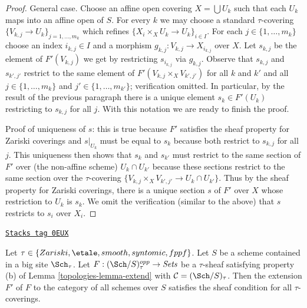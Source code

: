 \begin{proof}
\medskip\noindent
General case. Choose an affine open covering $X = \bigcup U_k$ such that
each $U_k$ maps into an affine open of $S$. For every $k$ we may choose
a standard $\tau$-covering $\{V_{k, j} \to U_k\}_{j = 1, \ldots, m_k}$
which refines $\{X_i \times_X U_k \to U_k\}_{i \in I}$. For each
$j \in \{1, \ldots, m_k\}$ choose an index $i_{k, j} \in I$
and a morphism $g_{k, j} : V_{k, j} \to X_{i_{k, j}}$ over $X$.
Let $s_{k, j}$ be the element of $F'(V_{k, j})$ we get by restricting
$s_{i_{k, j}}$ via $g_{k, j}$. Observe that $s_{k, j}$ and $s_{k', j'}$
restrict to the same element of $F'(V_{k, j} \times_X V_{k', j'})$
for all $k$ and $k'$ and all $j \in \{1, \ldots, m_k\}$
and $j' \in \{1, \ldots, m_{k'}\}$; verification omitted.
In particular, by the result of the previous paragraph there is a unique
element $s_k \in F'(U_k)$ restricting to $s_{k, j}$ for all $j$.
With this notation we are ready to finish the proof.

\medskip\noindent
Proof of uniqueness of $s$: this is true because $F'$ satisfies
the sheaf property for Zariski coverings and $s|_{U_k}$ must be equal
to $s_k$ because both restrict to $s_{k, j}$ for all $j$.
This uniqueness then shows that $s_k$ and $s_{k'}$ must restrict
to the same section of $F'$ over (the non-affine scheme) $U_k \cap U_{k'}$
because these sections restrict to the same section over the
$\tau$-covering $\{V_{k, j} \times_X V_{k', j'} \to U_k \cap U_{k'}\}$.
Thus by the sheaf property for Zariski coverings, there is a unique
section $s$ of $F'$ over $X$ whose restriction to $U_k$ is $s_k$.
We omit the verification (similar to the above) that $s$ restricts
to $s_i$ over $X_i$.
\end{proof}

\begin{lemma}
\label{topologies-lemma-extend-sheaf}
\href{https://stacks.math.columbia.edu/tag/0EUX}{\texttt{Stacks tag 0EUX}}

Let $\tau \in \{Zariski, \etale, smooth, syntomic, fppf\}$.
Let $S$ be a scheme contained in a big site $\Sch_\tau$.
Let $F : (\Sch/S)_\tau^{opp} \to \textit{Sets}$ be a $\tau$-sheaf
satisfying property (b) of Lemma \ref{topologies-lemma-extend} with
$\mathcal{C} = (\Sch/S)_\tau$. Then the extension
$F'$ of $F$ to the category of all schemes over $S$
satisfies the sheaf condition for all $\tau$-coverings.
\end{lemma}

